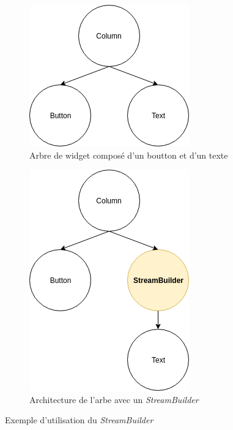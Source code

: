 \begin{figure}[H]
  \centering
  \begin{subfigure}{.5\textwidth}
    \centering
    \includegraphics[width=.8\linewidth]{content/imgs/ex1.png}
    \caption{Arbre de widget composé d'un boutton et d'un texte}
    \label{fig:stream_ex1}
  \end{subfigure}%
  \begin{subfigure}{.5\textwidth}
    \centering
    \includegraphics[width=.8\linewidth]{content/imgs/ex2.png}
    \caption{Architecture de l'arbe avec un \textit{StreamBuilder}}
  \end{subfigure}
  \caption{Exemple d'utilisation du \textit{StreamBuilder}}
\end{figure}


